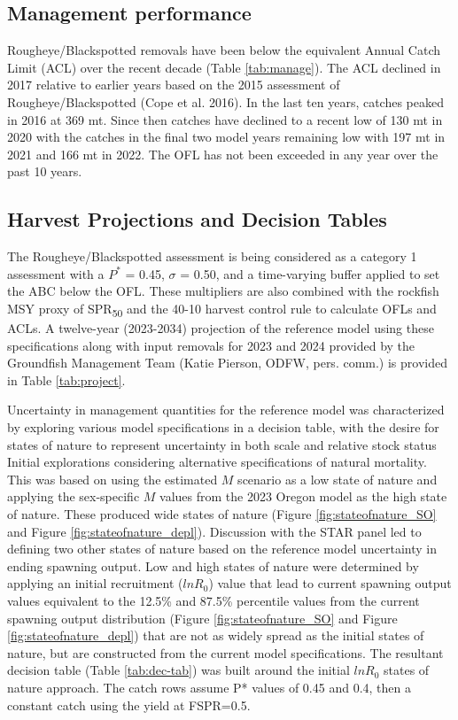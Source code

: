 \documentclass[
]{scrartcl}
\begin{document}
\subsection{Management performance}\label{management-performance-2}

Rougheye/Blackspotted removals have been below the equivalent Annual
Catch Limit (ACL) over the recent decade (Table \ref{tab:manage}). The
ACL declined in 2017 relative to earlier years based on the 2015
assessment of Rougheye/Blackspotted (Cope et al. 2016). In the last ten
years, catches peaked in 2016 at 369 mt. Since then catches have
declined to a recent low of 130 mt in 2020 with the catches in the final
two model years remaining low with 197 mt in 2021 and 166 mt in 2022.
The OFL has not been exceeded in any year over the past 10 years.

\subsection{Harvest Projections and Decision
Tables}\label{harvest-projections-and-decision-tables-1}

The Rougheye/Blackspotted assessment is being considered as a category 1
assessment with a \(P^*\) = 0.45, \(\sigma\) = 0.50, and a time-varying
buffer applied to set the ABC below the OFL. These multipliers are also
combined with the rockfish MSY proxy of SPR\textsubscript{50} and the
40-10 harvest control rule to calculate OFLs and ACLs. A twelve-year
(2023-2034) projection of the reference model using these specifications
along with input removals for 2023 and 2024 provided by the Groundfish
Management Team (Katie Pierson, ODFW, pers. comm.) is provided in Table
\ref{tab:project}.

Uncertainty in management quantities for the reference model was
characterized by exploring various model specifications in a decision
table, with the desire for states of nature to represent uncertainty in
both scale and relative stock status Initial explorations considering
alternative specifications of natural mortality. This was based on using
the estimated \(M\) scenario as a low state of nature and applying the
sex-specific \(M\) values from the 2023 Oregon model as the high state
of nature. These produced wide states of nature (Figure
\ref{fig:stateofnature_SO} and Figure \ref{fig:stateofnature_depl}).
Discussion with the STAR panel led to defining two other states of
nature based on the reference model uncertainty in ending spawning
output. Low and high states of nature were determined by applying an
initial recruitment (\(lnR_0\)) value that lead to current spawning
output values equivalent to the 12.5\% and 87.5\% percentile values from
the current spawning output distribution (Figure
\ref{fig:stateofnature_SO} and Figure \ref{fig:stateofnature_depl}) that
are not as widely spread as the initial states of nature, but are
constructed from the current model specifications. The resultant
decision table (Table \ref{tab:dec-tab}) was built around the initial
\(lnR_0\) states of nature approach. The catch rows assume P* values of
0.45 and 0.4, then a constant catch using the yield at FSPR=0.5.
\end{document}
